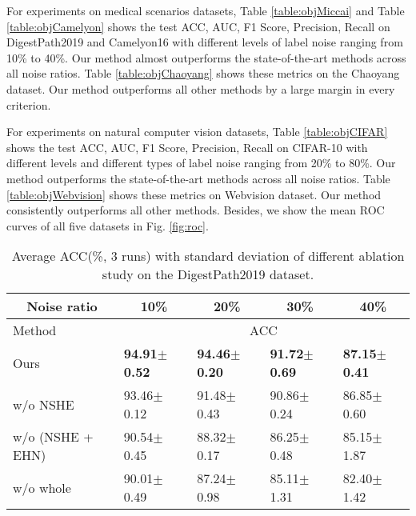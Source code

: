 {For experiments on medical scenarios datasets, Table \ref{table:objMiccai} and Table \ref{table:objCamelyon} shows the test ACC, AUC, F1 Score, {Precision}, Recall on DigestPath2019 and Camelyon16 with different levels of label noise ranging from 10\% to 40\%. Our method almost outperforms the state-of-the-art methods across all noise ratios. Table \ref{table:objChaoyang} shows these metrics on the Chaoyang dataset. Our method outperforms all other methods by a large margin in every criterion. 

For experiments on natural computer vision datasets, Table \ref{table:objCIFAR} shows the test ACC, AUC, F1 Score, {Precision}, Recall on CIFAR-10 with different levels and different types of label noise ranging from 20\% to 80\%. Our method outperforms the state-of-the-art methods across all noise ratios. Table \ref{table:objWebvision} shows these metrics on Webvision dataset. Our method consistently outperforms all other methods. Besides, we show the mean {ROC} curves of all five datasets in Fig. \ref{fig:roc}.}





\begin{table}[]
\scriptsize
\centering
\caption{Average ACC(\%, 3 runs) with standard deviation of different ablation study on the DigestPath2019 dataset.}
\label{table:albMiccai}
\begin{tabular}{lllll}
\toprule
\multicolumn{1}{c}{Noise ratio}        & \multicolumn{1}{c}{10\%} & \multicolumn{1}{c}{20\%} & \multicolumn{1}{c}{30\%} & \multicolumn{1}{c}{40\%} \\ \midrule
Method                 & \multicolumn{4}{c}{ACC}                                                                                     \\ \midrule
Ours                                       & \textbf{94.91$\pm$0.52}      & \textbf{94.46$\pm$0.20}      & \textbf{91.72$\pm$0.69}      & \textbf{87.15$\pm$0.41}     \\ 
w/o NSHE                       & 93.46$\pm$0.12               & 91.48$\pm$0.43               & 90.86$\pm$0.24               & 86.85$\pm$0.60              \\ 
w/o (NSHE + EHN)       & 90.54$\pm$0.45               & 88.32$\pm$0.17               & 86.25$\pm$0.48               & 85.15$\pm$1.87              \\ 
w/o whole & 90.01$\pm$0.49               & 87.24$\pm$0.98               & 85.11$\pm$1.31               & 82.40$\pm$1.42              \\ \bottomrule
\end{tabular}
\end{table}

